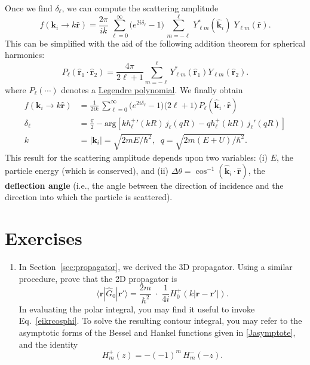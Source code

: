 \documentclass[pra,12pt]{revtex4}
\begin{document}
Once we find $\delta_\ell$, we can compute the scattering amplitude
\begin{equation}
  f(\mathbf{k}_i\rightarrow k\hat{\mathbf{r}}) = \frac{2 \pi}{ik}\, \sum_{\ell =0}^\infty \big(e^{2i\delta_\ell} - 1\big) \, \sum_{m=-\ell}^\ell \,Y_{\ell m}^*(\hat{\mathbf{k}}_i)\; Y_{\ell m}(\hat{\mathbf{r}}).
\end{equation}
This can be simplified with the aid of the following addition theorem
for spherical harmonics:
\begin{equation}
  P_\ell(\hat{\mathbf{r}}_1\cdot\hat{\mathbf{r}}_2) = \frac{4\pi}{2\ell+1} \sum_{m=-\ell}^{\ell} Y_{\ell m}^*(\hat{\mathbf{r}}_1) Y_{\ell m}(\hat{\mathbf{r}}_2).
\end{equation}
where $P_\ell(\cdots)$ denotes a
\href{https://en.wikipedia.org/wiki/Legendre_polynomials}{Legendre
  polynomial}.  We finally obtain
\begin{equation}
  \boxed{\quad\begin{aligned}f(\mathbf{k}_i \rightarrow k\hat{\mathbf{r}}) &= \frac{1}{2ik}\, \sum_{\ell =0}^\infty \big(e^{2i\delta_\ell} - 1\big) \big(2\ell+1\big)\, P_{\ell}(\hat{\mathbf{k}}_i\cdot \hat{\mathbf{r}}) \\ \delta_\ell &= \frac{\pi}{2} - \mathrm{arg}\!\left[k{h_\ell^+}'(kR) \, j_\ell(qR) - qh_\ell^+(kR)\, j_\ell'(qR)\right] \\ k &= |\mathbf{k}_i| = \sqrt{2mE/\hbar^2}, \;\; q = \sqrt{2m(E+U)/\hbar^2}.\end{aligned}\quad}
\end{equation}
This result for the scattering amplitude depends upon two variables:
(i) $E$, the particle energy (which is conserved), and (ii) $\Delta
\theta = \cos^{-1}(\hat{\mathbf{k}}_i\cdot \hat{\mathbf{r}})$, the
\textbf{deflection angle} (i.e., the angle between the direction of
incidence and the direction into which the particle is scattered).

\section*{Exercises}

\begin{enumerate}
\item \label{ex:2dpropagator}
  In Section~\ref{sec:propagator}, we derived the 3D propagator.
  Using a similar procedure, prove that the 2D propagator is
  \begin{equation}
    \langle\mathbf{r}|\hat{G}_0|\mathbf{r}'\rangle = \frac{2m}{\hbar^2}\;
    \cdot\; \frac{1}{4i} H^+_0(k|\mathbf{r}-\mathbf{r'}|).
  \end{equation}
  In evaluating the polar integral, you may find it useful to invoke
  Eq.~\eqref{eikrcosphi}.  To solve the resulting contour integral,
  you may refer to the asymptotic forms of the Bessel and Hankel
  functions given in \eqref{Jasymptote}, and the identity
  \begin{equation}
    H_m^+(z) = - (-1)^m \, H_m^-(-z).
  \end{equation}

  

\end{enumerate}
\end{document}
